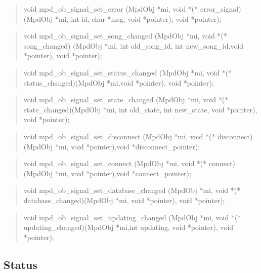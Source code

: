 \documentclass[a4paper,11pt]{article}
\begin{document}
\begin{quote}
void 		mpd\_ob\_signal\_set\_error			
(MpdObj *mi, void *(* error\_signal)(MpdObj *mi, int id, char *msg, void *pointer),
void *pointer);
\end{quote}

\begin{quote}
void 		mpd\_ob\_signal\_set\_song\_changed		
(MpdObj *mi, void *(* song\_changed)
(MpdObj *mi, int old\_song\_id, int new\_song\_id,void *pointer), 
void *pointer);
\end{quote}

\begin{quote}
void 		mpd\_ob\_signal\_set\_status\_changed	
(MpdObj *mi, void *(* status\_changed)(MpdObj *mi,void *pointer), void *pointer);
\end{quote}

\begin{quote}
void 		mpd\_ob\_signal\_set\_state\_changed 	
(MpdObj *mi, void *(* state\_changed)(MpdObj *mi, int old\_state, int new\_state, void *pointer),
void *pointer);
\end{quote}

\begin{quote}
void 		mpd\_ob\_signal\_set\_disconnect		
(MpdObj *mi, void *(* disconnect)(MpdObj *mi, void *pointer),void *disconnect\_pointer);

\end{quote}

\begin{quote}
void 		mpd\_ob\_signal\_set\_connect		
(MpdObj *mi, void *(* connect)(MpdObj *mi, void *pointer),void *connect\_pointer);
\end{quote}

\begin{quote}
void 		mpd\_ob\_signal\_set\_database\_changed	
(MpdObj *mi, void *(* database\_changed)(MpdObj *mi, void *pointer), void *pointer);
\end{quote}

\begin{quote}
void 		mpd\_ob\_signal\_set\_updating\_changed	
(MpdObj *mi, void *(* updating\_changed)(MpdObj *mi,int updating, void *pointer), 
void *pointer);
\end{quote}



\subsection{Status}
\end{document}
